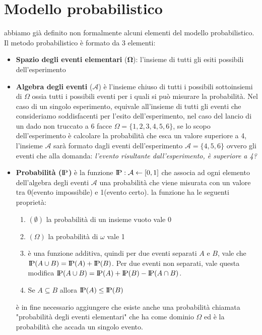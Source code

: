 \documentclass{article}
\newcommand{\probP}{\text{I\kern-0.15em P}}
\begin{document}
\section{Modello probabilistico}
abbiamo già definito non formalmente alcuni elementi del modello probabilistico. Il metodo probabilistico è formato da 3 elementi:
\begin{itemize}
    \item \textbf{Spazio degli eventi elementari} ($\boldsymbol{\Omega}$): l'insieme di tutti gli esiti possibili dell'esperimento
    \item \textbf{Algebra degli eventi} ($\boldsymbol{\mathcal{A}}$) è l'insieme chiuso di tutti i possibili sottoinsiemi di $\Omega$ ossia tutti i possibili eventi per i quali si può misurare la probabilità. Nel caso di un singolo esperimento, equivale all'insieme di tutti gli eventi che consideriamo soddisfacenti per l'esito dell'esperimento, nel caso del lancio di un dado non truccato a 6 facce $\Omega=\{1,2,3,4,5,6\}$, se lo scopo dell'esperimento è calcolare la probabilità che esca un valore superiore a 4, l'insieme $\mathcal{A}$ sarà formato dagli eventi dell'esperimento $\mathcal{A}=\{4,5,6\}$ ovvero gli eventi che alla domanda: \textit{l'evento risultante dall'esperimento, è superiore a 4?}
    \item \textbf{Probabilità ($\probP$)} è la funzione $\probP :\mathcal{A}\leftarrow [0,1]$ che associa ad ogni elemento dell'algebra degli eventi $\mathcal{A}$ una probabilità che viene misurata con un valore tra 0(evento impossibile) e 1(evento certo).
    la funzione \probP ha le seguenti proprietà:
    \begin{enumerate}
        \item \probP$(\emptyset)$ la probabilità di un insieme vuoto vale 0
        \item \probP$(\Omega)$ la probabilità di $\omega$ vale 1
        \item \probP è una funzione additiva, quindi per due eventi separati $A$ e $B$, vale che $\probP(A\cup B)=\probP(A)+\probP(B)$. Per due eventi non separati, vale questa modifica $\probP(A\cup B)=\probP(A)+\probP(B)-\probP(A\cap B)$.
        \item Se $A \subseteq B$ allora $\probP(A) \le \probP(B)$
    \end{enumerate}
    è in fine necessario aggiungere che esiste anche una probabilità chiamata "probabilità degli eventi elementari" che ha come dominio $\Omega$ ed è la probabilità che accada un singolo evento.
\end{itemize}
\end{document}

